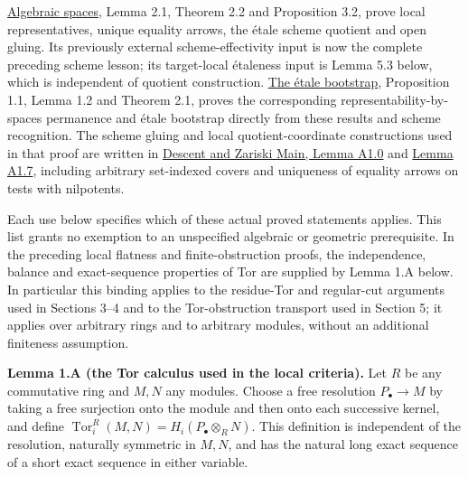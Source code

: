 \documentclass[11pt,a4paper,openany]{report}
\begin{document}
\begin{itemize}
  \href{https://github.com/KokunoYumeto/open-math-courses/blob/d02d0a3669f42579db037cd44de1d113fdd770a1/docs/courses/AG-GS/prerequisites/AG-AS/src/algebraic-spaces.md}{Algebraic spaces}, Lemma 2.1, Theorem 2.2 and Proposition 3.2, prove local representatives, unique equality arrows, the étale scheme quotient and open gluing. Its previously external scheme-effectivity input is now the complete preceding scheme lesson; its target-local étaleness input is Lemma 5.3 below, which is independent of quotient construction. \href{https://github.com/KokunoYumeto/open-math-courses/blob/d02d0a3669f42579db037cd44de1d113fdd770a1/docs/courses/AG-GS/prerequisites/AG-AS/src/bootstrap-theorem.md}{The étale bootstrap}, Proposition 1.1, Lemma 1.2 and Theorem 2.1, proves the corresponding representability-by-spaces permanence and étale bootstrap directly from these results and scheme recognition. The scheme gluing and local quotient-coordinate constructions used in that proof are written in \href{https://github.com/KokunoYumeto/open-math-courses/blob/main/docs/courses/AG-RG/AG-RG-S04.md\#scheme-open-gluing}{Descent and Zariski Main, Lemma A1.0} and \href{https://github.com/KokunoYumeto/open-math-courses/blob/main/docs/courses/AG-RG/AG-RG-S04.md\#quotient-local-coordinates}{Lemma A1.7}, including arbitrary set-indexed covers and uniqueness of equality arrows on tests with nilpotents.
\end{itemize}

Each use below specifies which of these actual proved statements applies. This list grants no exemption to an unspecified algebraic or geometric prerequisite. In the preceding local flatness and finite-obstruction proofs, the independence, balance and exact-sequence properties of Tor are supplied by Lemma 1.A below. In particular this binding applies to the residue-Tor and regular-cut arguments used in Sections 3--4 and to the Tor-obstruction transport used in Section 5; it applies over arbitrary rings and to arbitrary modules, without an additional finiteness assumption.

\label{AG-RG-S07-ag-rg-s07-tor}

\textbf{Lemma 1.A (the Tor calculus used in the local criteria).} Let \(R\) be any commutative ring and \(M,N\) any modules. Choose a free resolution \(P_\bullet\to M\) by taking a free surjection onto the module and then onto each successive kernel, and define \(\operatorname{Tor}_i^R(M,N)=H_i(P_\bullet\otimes_R N)\). This definition is independent of the resolution, naturally symmetric in \(M,N\), and has the natural long exact sequence of a short exact sequence in either variable.
\end{document}

